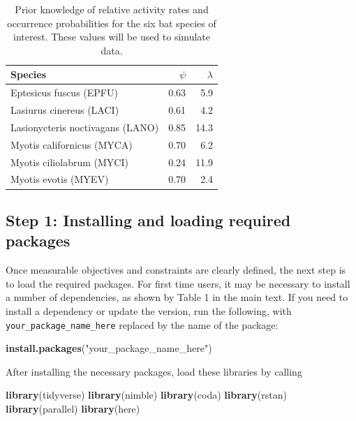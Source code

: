 \documentclass[
]{article}
\newenvironment{Shaded}{\begin{snugshade}}{\end{snugshade}}
\newcommand{\FunctionTok}[1]{\textcolor[rgb]{0.13,0.29,0.53}{\textbf{#1}}}
\newcommand{\NormalTok}[1]{#1}
\newcommand{\StringTok}[1]{\textcolor[rgb]{0.31,0.60,0.02}{#1}}
\begin{document}
\linespread{1}
\begin{table}

\caption{\label{tab:assemblage}Prior knowledge of relative activity rates and occurrence probabilities for the six bat species of interest. These values will be used to simulate data. }
\centering
\begin{tabular}[t]{lrr}
\toprule
Species & $\psi$ & $\lambda$\\
\midrule
Eptesicus fuscus (EPFU) & 0.63 & 5.9\\
Lasiurus cinereus (LACI) & 0.61 & 4.2\\
Lasionycteris noctivagans (LANO) & 0.85 & 14.3\\
Myotis californicus (MYCA) & 0.70 & 6.2\\
Myotis ciliolabrum (MYCI) & 0.24 & 11.9\\
\addlinespace
Myotis evotis (MYEV) & 0.70 & 2.4\\
\bottomrule
\end{tabular}
\end{table}

\linespread{1}

\subsection{Step 1: Installing and loading required packages}\label{step-1-installing-and-loading-required-packages}

Once measurable objectives and constraints are clearly defined, the next step is to load the required packages. For first time users, it may be necessary to install a number of dependencies, as shown by Table 1 in the main text. If you need to install a dependency or update the version, run the following, with \texttt{your\_package\_name\_here} replaced by the name of the package:

\linespread{1}

\begin{Shaded}
\begin{Highlighting}[]
\FunctionTok{install.packages}\NormalTok{(}\StringTok{"your\_package\_name\_here"}\NormalTok{)}
\end{Highlighting}
\end{Shaded}

\linespread{1}

After installing the necessary packages, load these libraries by calling

\linespread{1}

\begin{Shaded}
\begin{Highlighting}[]
\FunctionTok{library}\NormalTok{(tidyverse)}
\FunctionTok{library}\NormalTok{(nimble)}
\FunctionTok{library}\NormalTok{(coda)}
\FunctionTok{library}\NormalTok{(rstan)}
\FunctionTok{library}\NormalTok{(parallel)}
\FunctionTok{library}\NormalTok{(here)}
\end{Highlighting}
\end{Shaded}
\end{document}

